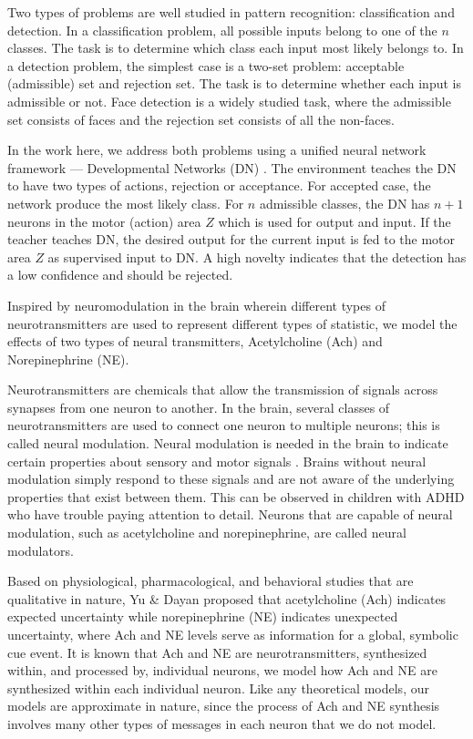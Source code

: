 \documentclass[conference]{IEEEtran}
\begin{document}
Two types of problems are well studied in pattern recognition: classification and detection.   
In a classification problem, all possible inputs belong to one of the $n$ classes.   The task is to determine 
which class each input most likely belongs to.   In a detection problem, the simplest case is a two-set
problem: acceptable (admissible) set and rejection set.   The task is to determine whether each input is
admissible or not.   Face detection is a widely studied task, where the admissible set consists of faces and
the rejection set consists of all the non-faces.   

In the work here, we address both problems using a unified neural network framework --- Developmental Networks (DN) \cite{WengNAI12}.    The environment teaches the DN to have two types of actions, 
rejection or acceptance.  For accepted case, the network produce the most likely class.    For $n$ admissible
classes, the DN has $n+1$ neurons in the motor (action) area $Z$ which is used for output and input.
If the teacher teaches DN, the desired output for the current input is fed to the motor area $Z$ as 
supervised input to DN.  A high novelty indicates that the detection has a low confidence and should be rejected. 

Inspired by neuromodulation in the brain wherein different types of
neurotransmitters are used to represent different types of statistic,
we model the effects of two types of neural transmitters, Acetylcholine (Ach) and Norepinephrine (NE).

Neurotransmitters are chemicals that allow the transmission of signals across synapses from one neuron to another. In the brain, several classes of neurotransmitters are used to connect one neuron to multiple neurons; this is called neural modulation. Neural modulation is needed in the brain to indicate certain properties about
sensory and motor signals \cite{WengNAI12}. Brains without neural modulation simply
respond to these signals and are not aware of the underlying properties that exist between them. This can be observed in children with ADHD who have trouble paying attention to detail. Neurons that are capable of neural modulation, such as acetylcholine and norepinephrine, are called neural modulators.

Based on physiological, pharmacological, and behavioral studies that are qualitative in nature, Yu \& Dayan \cite{Yu05} proposed that acetylcholine (Ach) indicates expected uncertainty while norepinephrine (NE) indicates unexpected uncertainty, where Ach and NE levels serve as information for a global, symbolic cue event.  It is known that Ach and NE are neurotransmitters, synthesized within, and processed by, individual neurons, we model how Ach and NE are synthesized within each individual neuron.  Like any theoretical models, our models are approximate in nature, since the process of Ach and NE synthesis involves many other types of messages in each neuron that we do not model. 
\end{document}
